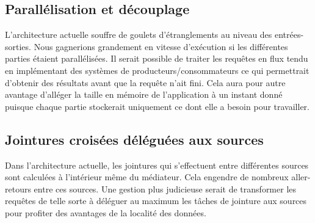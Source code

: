 \subsection{Parallélisation et découplage}

L’architecture actuelle souffre de goulets d’étranglements au niveau des entrées-sorties. Nous gagnerions grandement en vitesse d’exécution si les différentes parties étaient parallélisées. Il serait possible de traiter les requêtes en flux tendu en implémentant des systèmes de producteurs/consommateurs ce qui permettrait d’obtenir des résultats avant que la requête n’ait  fini. Cela aura pour autre avantage d’alléger la taille en mémoire de l'application à un instant donné puisque chaque partie stockerait uniquement ce dont elle a besoin pour travailler.

\subsection{Jointures croisées déléguées aux sources}

Dans l’architecture actuelle, les jointures qui s’effectuent entre différentes sources sont calculées à l’intérieur même du médiateur. Cela engendre de nombreux aller-retours entre ces sources. Une gestion plus judicieuse serait de transformer les requêtes de telle sorte à déléguer au maximum les tâches de jointure aux sources pour profiter des avantages de la localité des données.